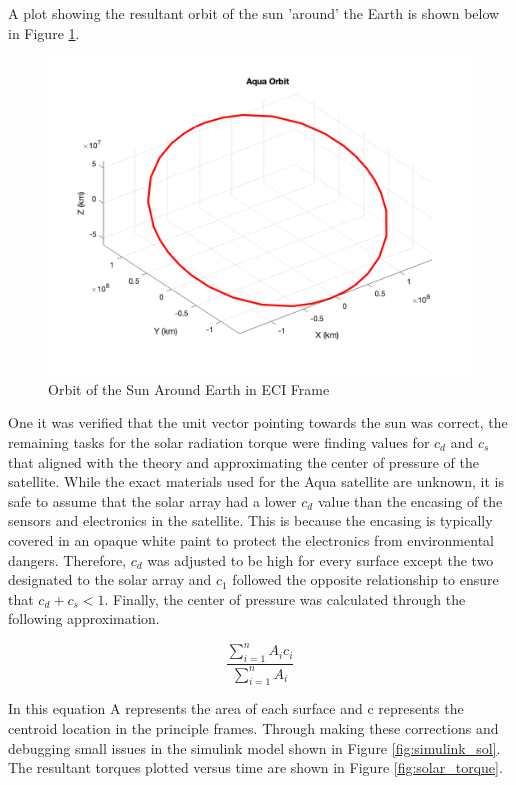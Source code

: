 A plot showing the resultant orbit of the sun 'around' the Earth is shown below in Figure \ref{fig:sun_orbit}.

\begin{figure}[H]
    \centering
    \captionsetup{ justification = centering }
    \includegraphics[width = 12cm]{Images/PS6/sunOrbit.png}
    \caption{Orbit of the Sun Around Earth in ECI Frame}
    \label{fig:sun_orbit}
\end{figure}

One it was verified that the unit vector pointing towards the sun was correct, the remaining tasks for the solar radiation torque were finding values for $c_d$ and $c_s$ that aligned with the theory and approximating the center of pressure of the satellite. While the exact materials used for the Aqua satellite are unknown, it is safe to assume that the solar array had a lower $c_d$ value than the encasing of the sensors and electronics in the satellite. This is because the encasing is typically covered in an opaque white paint to protect the electronics from environmental dangers. Therefore, $c_d$ was adjusted to be high for every surface except the two designated to the solar array and $c_1$ followed the opposite relationship to ensure that $c_d + c_s < 1$. Finally, the center of pressure was calculated through the following approximation.

\begin{equation}
    \frac{\sum^n_{i=1} A_i c_i}{\sum^n_{i=1} A_i}
\end{equation}

In this equation A represents the area of each surface and c represents the centroid location in the principle frames. Through making these corrections and debugging small issues in the simulink model shown in Figure \ref{fig:simulink_sol}. The resultant torques plotted versus time are shown in Figure \ref{fig:solar_torque}.

